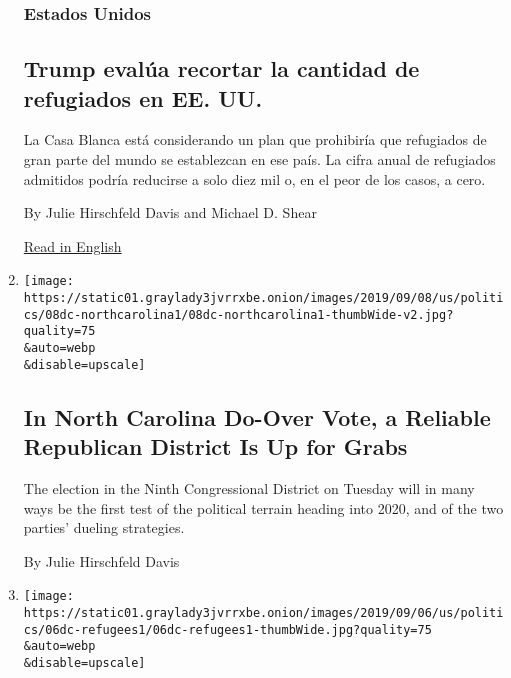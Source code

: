 \begin{enumerate}
  \hypertarget{estados-unidos}{%
  \subsubsection{Estados Unidos}\label{estados-unidos}}

  \hypertarget{trump-evaluxfaa-recortar-la-cantidad-de-refugiados-en-ee-uu}{%
  \subsection{Trump evalúa recortar la cantidad de refugiados en EE.
  UU.}\label{trump-evaluxfaa-recortar-la-cantidad-de-refugiados-en-ee-uu}}

  La Casa Blanca está considerando un plan que prohibiría que refugiados
  de gran parte del mundo se establezcan en ese país. La cifra anual de
  refugiados admitidos podría reducirse a solo diez mil o, en el peor de
  los casos, a cero.

  By Julie Hirschfeld Davis and Michael D. Shear

  \href{https://www.nytimes3xbfgragh.onion/2019/09/06/us/politics/trump-refugees-united-states.html}{Read
  in English}
\item
  \href{/2019/09/08/us/politics/north-carolina-special-election.html}{}

  \texttt{[image: https://static01.graylady3jvrrxbe.onion/images/2019/09/08/us/politics/08dc-northcarolina1/08dc-northcarolina1-thumbWide-v2.jpg?quality=75\\\&auto=webp\\\&disable=upscale]}

  \hypertarget{in-north-carolina-do-over-vote-a-reliable-republican-district-is-up-for-grabs}{%
  \subsection{In North Carolina Do-Over Vote, a Reliable Republican
  District Is Up for
  Grabs}\label{in-north-carolina-do-over-vote-a-reliable-republican-district-is-up-for-grabs}}

  The election in the Ninth Congressional District on Tuesday will in
  many ways be the first test of the political terrain heading into
  2020, and of the two parties' dueling strategies.

  By Julie Hirschfeld Davis
\item
  \href{/2019/09/06/us/politics/trump-refugees-united-states.html}{}

  \texttt{[image: https://static01.graylady3jvrrxbe.onion/images/2019/09/06/us/politics/06dc-refugees1/06dc-refugees1-thumbWide.jpg?quality=75\\\&auto=webp\\\&disable=upscale]}


\end{enumerate}
